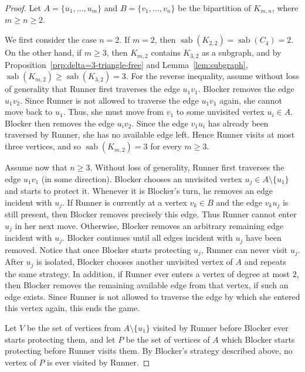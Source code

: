 \documentclass[12pt]{article}
\DeclareMathOperator{\sab}{\mathrm{sab}}
\begin{document}
\begin{proof}
Let $A=\{u_1,\ldots,u_m\}$ and $B=\{v_1,\ldots,v_n\}$ be the bipartition of $K_{m,n}$, where $m\ge n\ge 2$.

We first consider the case $n=2$. If $m=2$, then $\sab(K_{2,2})=\sab(C_4)=2$. On the other hand, if $m\ge 3$, then $K_{m,2}$ contains $K_{3,2}$ as a subgraph, and by Proposition~\ref{prp:delta=3-triangle-free} and Lemma~\ref{lem:subgraph}, $\sab(K_{m,2})\ge \sab(K_{3,2})=3$. For the reverse inequality, assume without loss of generality that Runner first traverses the edge $u_1v_1$. Blocker removes the edge $u_1v_2$. Since Runner is not allowed to traverse the edge $u_1v_1$ again, she cannot move back to $u_1$. Thus, she must move from $v_1$ to some unvisited vertex $u_i\in A$. Blocker then removes the edge $u_iv_2$. Since the edge $v_1u_i$ has already been traversed by Runner, she has no available edge left. Hence Runner
visits at most three vertices, and so $\sab(K_{m,2})=3$ for every $m\ge 3$.

Assume now that $n\ge 3$. Without loss of generality, Runner first traverses
the edge $u_1v_1$ (in some direction). Blocker chooses an unvisited vertex
$u_j\in A\setminus\{u_1\}$ and starts to protect it. Whenever it is Blocker's turn,
he removes an edge incident with $u_j$. If Runner is currently at a vertex
$v_k\in B$ and the edge $v_ku_j$ is still present, then Blocker removes precisely
this edge. Thus Runner cannot enter $u_j$ in her next move. Otherwise, Blocker
removes an arbitrary remaining edge incident with $u_j$. Blocker continues until all edges incident with $u_j$ have been removed. Notice that once Blocker starts protecting $u_j$, Runner can never visit $u_j$. After $u_j$ is isolated, Blocker chooses another unvisited vertex of $A$ and repeats the same strategy. In addition, if Runner ever enters a vertex of degree at most $2$, then Blocker removes the remaining available edge from that vertex, if such an edge exists. Since Runner is not allowed to traverse the edge by which she entered this vertex again, this ends the game.

Let $V$ be the set of vertices from $A\setminus\{u_1\}$ visited by Runner before
Blocker ever starts protecting them, and let $P$ be the set of vertices of $A$ which
Blocker starts protecting before Runner visits them. By Blocker's strategy described above, no vertex of $P$ is ever visited by Runner.


\end{proof}
\end{document}
